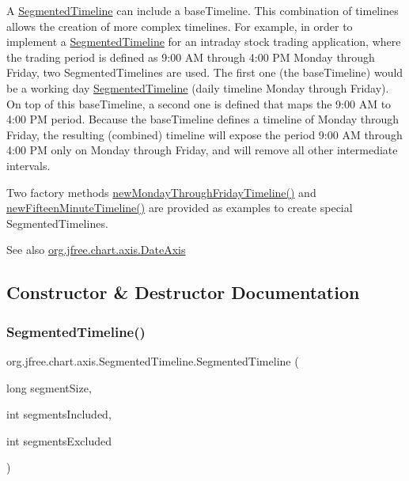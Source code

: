 A \mbox{\hyperlink{classorg_1_1jfree_1_1chart_1_1axis_1_1_segmented_timeline}{Segmented\+Timeline}} can include a base\+Timeline. This combination of timelines allows the creation of more complex timelines. For example, in order to implement a \mbox{\hyperlink{classorg_1_1jfree_1_1chart_1_1axis_1_1_segmented_timeline}{Segmented\+Timeline}} for an intraday stock trading application, where the trading period is defined as 9\+:00 AM through 4\+:00 PM Monday through Friday, two Segmented\+Timelines are used. The first one (the base\+Timeline) would be a working day \mbox{\hyperlink{classorg_1_1jfree_1_1chart_1_1axis_1_1_segmented_timeline}{Segmented\+Timeline}} (daily timeline Monday through Friday). On top of this base\+Timeline, a second one is defined that maps the 9\+:00 AM to 4\+:00 PM period. Because the base\+Timeline defines a timeline of Monday through Friday, the resulting (combined) timeline will expose the period 9\+:00 AM through 4\+:00 PM only on Monday through Friday, and will remove all other intermediate intervals.

Two factory methods \mbox{\hyperlink{classorg_1_1jfree_1_1chart_1_1axis_1_1_segmented_timeline_a298842f4c7afa5dc9d3737304ce9ebc2}{new\+Monday\+Through\+Friday\+Timeline()}} and \mbox{\hyperlink{classorg_1_1jfree_1_1chart_1_1axis_1_1_segmented_timeline_a5547c304db2d82d577d46c4fa916ae99}{new\+Fifteen\+Minute\+Timeline()}} are provided as examples to create special Segmented\+Timelines.

\begin{DoxySeeAlso}{See also}
\mbox{\hyperlink{classorg_1_1jfree_1_1chart_1_1axis_1_1_date_axis}{org.\+jfree.\+chart.\+axis.\+Date\+Axis}} 
\end{DoxySeeAlso}


\subsection{Constructor \& Destructor Documentation}
\mbox{\label{classorg_1_1jfree_1_1chart_1_1axis_1_1_segmented_timeline_a0a573ec424a6813b42439491e791fc1b}} 
\subsubsection{\texorpdfstring{Segmented\+Timeline()}{SegmentedTimeline()}}
{\footnotesize\ttfamily org.\+jfree.\+chart.\+axis.\+Segmented\+Timeline.\+Segmented\+Timeline (\begin{DoxyParamCaption}\item[{long}]{segment\+Size,  }\item[{int}]{segments\+Included,  }\item[{int}]{segments\+Excluded }\end{DoxyParamCaption})}

